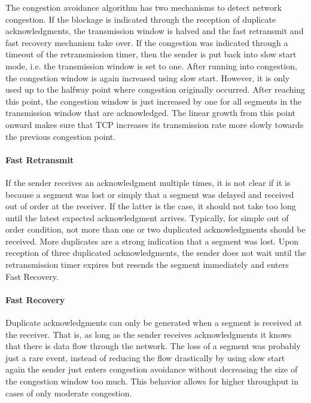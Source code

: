 The congestion avoidance algorithm has two mechanisms to detect network congestion. If the blockage is indicated through the reception of duplicate acknowledgments, the transmission window is halved and the fast retransmit and fast recovery mechanism take over. If the congestion was indicated through a timeout of the retransmission timer, then the sender is put back into slow start mode, i.e. the transmission window is set to one. After running into congestion, the congestion window is again increased using slow start. However, it is only used up to the halfway point where congestion originally occurred. After reaching this point, the congestion window is just increased by one for all segments in the transmission window that are acknowledged. The linear growth from this point onward makes sure that TCP increases its transmission rate more slowly towards the previous congestion point.  

\paragraph{Fast Retransmit}

If the sender receives an acknowledgment multiple times, it is not clear if it is because a segment was lost or simply that a segment was delayed and received out of order at the receiver. If the latter is the case, it should not take too long until the latest expected acknowledgment arrives. Typically, for simple out of order condition, not more than one or two duplicated acknowledgments should be received. More duplicates are a strong indication that a segment was lost. Upon reception of three duplicated acknowledgments, the sender does not wait until the retransmission timer expires but resends the segment immediately and enters Fast Recovery.

\paragraph{Fast Recovery}

Duplicate acknowledgments can only be generated when a segment is received at the receiver. That is, as long as the sender receives acknowledgments it knows that there is data flow through the network. The loss of a segment was probably just a rare event, instead of reducing the flow drastically by using slow start again the sender just enters congestion avoidance without decreasing the size of the congestion window too much. This behavior allows for higher throughput in cases of only moderate congestion.

